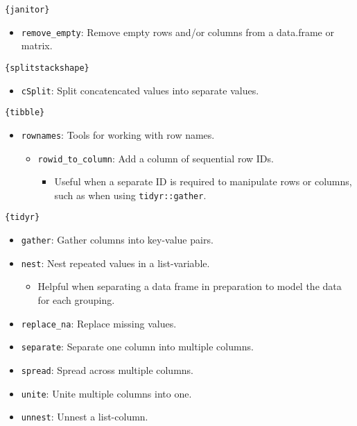 \documentclass[]{book}
\providecommand{\tightlist}{%
  \setlength{\itemsep}{0pt}\setlength{\parskip}{0pt}}
\begin{document}
\texttt{\{janitor\}}

\begin{itemize}
\tightlist
\item
  \texttt{remove\_empty}: Remove empty rows and/or columns from a data.frame or matrix.
\end{itemize}

\texttt{\{splitstackshape\}}

\begin{itemize}
\tightlist
\item
  \texttt{cSplit}: Split concatencated values into separate values.
\end{itemize}

\texttt{\{tibble\}}

\begin{itemize}
\tightlist
\item
  \texttt{rownames}: Tools for working with row names.

  \begin{itemize}
  \tightlist
  \item
    \texttt{rowid\_to\_column}: Add a column of sequential row IDs.

    \begin{itemize}
    \tightlist
    \item
      Useful when a separate ID is required to manipulate rows or columns, such as when using \texttt{tidyr::gather}.
    \end{itemize}
  \end{itemize}
\end{itemize}

\texttt{\{tidyr\}}

\begin{itemize}
\tightlist
\item
  \texttt{gather}: Gather columns into key-value pairs.
\item
  \texttt{nest}: Nest repeated values in a list-variable.

  \begin{itemize}
  \tightlist
  \item
    Helpful when separating a data frame in preparation to model the data for each grouping.
  \end{itemize}
\item
  \texttt{replace\_na}: Replace missing values.
\item
  \texttt{separate}: Separate one column into multiple columns.
\item
  \texttt{spread}: Spread across multiple columns.
\item
  \texttt{unite}: Unite multiple columns into one.
\item
  \texttt{unnest}: Unnest a list-column.
\end{itemize}
\end{document}
